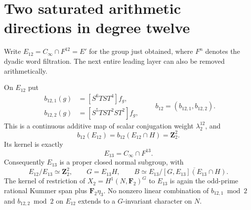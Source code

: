 \section{Two saturated arithmetic directions in degree twelve}
\label{sec:twelve-normalization}

Write $E_{12}=C_\infty\cap F^{12}=E'$ for the group just obtained,
where $F^n$ denotes the dyadic word filtration. The next entire
leading layer can also be removed arithmetically.

\begin{theorem}\label{thm:twelve-normalization}
On $E_{12}$ put
\[
 \begin{split}
 b_{12,1}(g)&=[S^6TST^4]f_g,\\
 b_{12,2}(g)&=[S^5TST^2ST^2]f_g,
 \end{split}
 \qquad b_{12}=(b_{12,1},b_{12,2}).
\]
This is a continuous additive map of scalar conjugation weight
$\lambda_2^{12}$, and
\[
 b_{12}(E_{12})=b_{12}(E_{12}\cap H)=\mathbf Z_2^2.
\]
Its kernel is exactly
\[
 E_{13}=C_\infty\cap F^{13}.
\]
Consequently $E_{13}$ is a proper closed normal subgroup, with
\[
 E_{12}/E_{13}\simeq\mathbf Z_2^2,\qquad G=E_{13}H,
 \qquad
 B\simeq E_{13}/\overline{[G,E_{13}](E_{13}\cap H)}.
\]
The kernel of restriction of $X_2=H^1(N,\mathbf F_2)^G$ to
$E_{13}$ is again the odd-prime rational Kummer span plus
$\mathbf F_2\eta_3$. No nonzero linear combination of
$b_{12,1}\bmod2$ and $b_{12,2}\bmod2$ on $E_{12}$ extends to
a $G$-invariant character on $N$.
\end{theorem}

